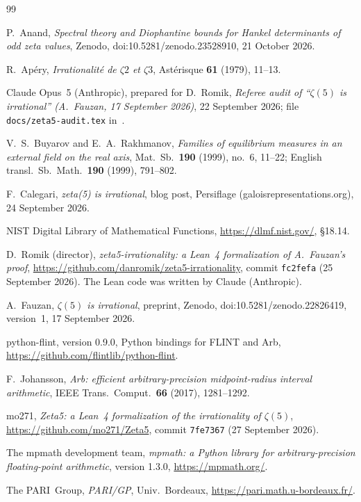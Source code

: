 \documentclass[11pt]{article}
\theoremstyle{remark}
\newcommand{\file}[1]{\texttt{#1}}
\begin{document}
\begin{thebibliography}{99}

 P.~Anand, \emph{Spectral theory and Diophantine bounds for Hankel determinants of odd zeta values}, Zenodo, doi:10.5281/zenodo.23528910, 21 October 2026.

 R.~Ap\'ery, \emph{Irrationalit\'e de $\zeta2$ et $\zeta3$}, Ast\'erisque \textbf{61} (1979), 11--13.

 Claude Opus~5 (Anthropic), prepared for D.~Romik, \emph{Referee audit of ``$\zeta(5)$ is irrational'' (A.~Fauzan, 17 September 2026)}, 22 September 2026; file \file{docs/zeta5-audit.tex} in~\cite{DR}.

 V.~S.~Buyarov and E.~A.~Rakhmanov, \emph{Families of equilibrium measures in an external field on the real axis}, Mat.\ Sb.\ \textbf{190} (1999), no.~6, 11--22; English transl.\ Sb.\ Math.\ \textbf{190} (1999), 791--802.

 F.~Calegari, \emph{zeta(5) is irrational}, blog post, Persiflage (galoisrepresentations.org), 24 September 2026.

 NIST Digital Library of Mathematical Functions, \url{https://dlmf.nist.gov/}, \S18.14.

 D.~Romik (director), \emph{zeta5-irrationality: a Lean~4 formalization of A.~Fauzan's proof}, \url{https://github.com/danromik/zeta5-irrationality}, commit \file{fc2fefa} (25 September 2026). The Lean code was written by Claude (Anthropic).

 A.~Fauzan, \emph{$\zeta(5)$ is irrational}, preprint, Zenodo, doi:10.5281/zenodo.22826419, version~1, 17 September 2026.

 python-flint, version 0.9.0, Python bindings for FLINT and Arb, \url{https://github.com/flintlib/python-flint}.

 F.~Johansson, \emph{Arb: efficient arbitrary-precision midpoint-radius interval arithmetic}, IEEE Trans.\ Comput.\ \textbf{66} (2017), 1281--1292.

 mo271, \emph{Zeta5: a Lean~4 formalization of the irrationality of $\zeta(5)$}, \url{https://github.com/mo271/Zeta5}, commit \file{7fe7367} (27 September 2026).

 The mpmath development team, \emph{mpmath: a Python library for arbitrary-precision floating-point arithmetic}, version 1.3.0, \url{https://mpmath.org/}.

 The PARI~Group, \emph{PARI/GP}, Univ.\ Bordeaux, \url{https://pari.math.u-bordeaux.fr/}.


\end{thebibliography}
\end{document}

